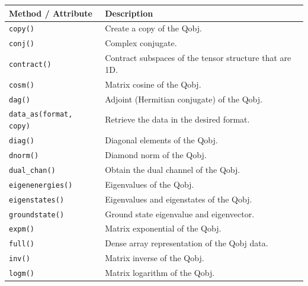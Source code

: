 \documentclass[preprint,3p,sort&compress]{elsarticle}
\def\code#1{\texttt{#1}}
\begin{document}
\begin{table}[!hp]
    \centering
    \renewcommand{\arraystretch}{1.1}
    \begin{tabular}{@{}lp{10cm}@{}}
        \toprule
        \textbf{Method / Attribute} & \textbf{Description} \\
        \midrule
        \code{copy()} & Create a copy of the Qobj. \\
       
        \code{conj()} & Complex conjugate. \\
       
        \code{contract()} & Contract subspaces of the tensor structure that are 1D. \\
  
        \code{cosm()} & Matrix cosine of the Qobj. \\
   
        \code{dag()} & Adjoint (Hermitian conjugate) of the Qobj. \\
  
        \code{data\_as(format, copy)} & Retrieve the data in the desired format. \\
 
        \code{diag()} & Diagonal elements of the Qobj. \\

        \code{dnorm()} & Diamond norm of the Qobj. \\
    
        \code{dual\_chan()} & Obtain the dual channel of the Qobj. \\
   
        \code{eigenenergies()} & Eigenvalues of the Qobj. \\
 
        \code{eigenstates()} & Eigenvalues and eigenstates of the Qobj. \\

        \code{groundstate()} & Ground state eigenvalue and eigenvector. \\

        \code{expm()} & Matrix exponential of the Qobj. \\

        \code{full()} & Dense array representation of the Qobj data. \\

        \code{inv()} & Matrix inverse of the Qobj. \\

        \code{logm()} & Matrix logarithm of the Qobj. \\
    

\end{tabular}
\end{table}
\end{document}
